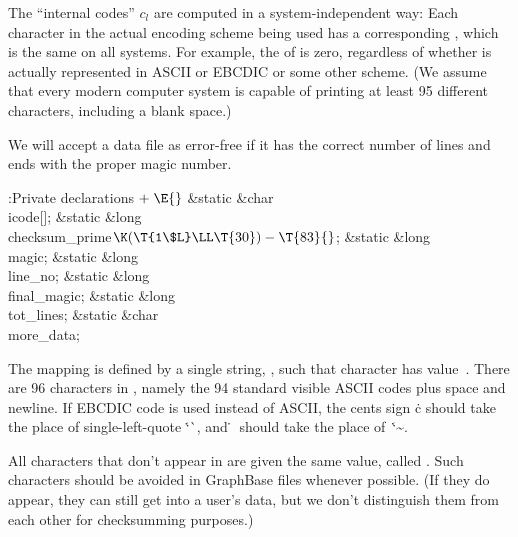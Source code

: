 The ``internal codes'' $c_l$ are computed in a system-independent way:
Each character  in the actual encoding scheme being used has a
corresponding , which is the same on all systems. For example,
the  of  is zero, regardless of whether 
is actually
represented in ASCII or EBCDIC or some other scheme. (We assume that
every modern computer system is capable of printing at least 95
different characters, including a blank space.)

We will accept a data file as error-free if it has the correct number of
lines and ends with the proper magic number.

\Y\B\4:Private declarations\X${}\mathrel+\E{}$\6
\&{static} \&{char} \\{icode}[];\6
\&{static} \&{long} \\{checksum\_prime}${}\K(\T{1\$L}\LL\T{30})-\T{83}{}$;\6
\&{static} \&{long} \\{magic};\6
\&{static} \&{long} \\{line\_no};\6
\&{static} \&{long} \\{final\_magic};\6
\&{static} \&{long} \\{tot\_lines};\6
\&{static} \&{char} \\{more\_data};\par
\fi

The  mapping is defined by a single string, ,
such that
character  has  value~. There are 96
characters
in , namely the 94 standard visible ASCII codes plus space
and newline. If EBCDIC code is used instead of ASCII, the
cents sign \rlap{\.{\kern.05em/}}\.c should take the place of single-left-quote
\.{\char`\`}, and \.{}~should take the place of\/~\.{\char`\~}.

All characters that don't appear in  are given the same 
value, called . Such characters should be avoided in
GraphBase files whenever possible. (If they do appear, they can still
get into a user's data, but we don't distinguish them from each other
for checksumming purposes.)

